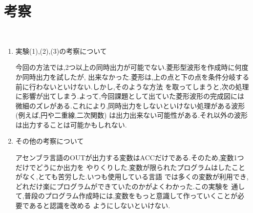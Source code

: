 \documentclass[a4paper,11pt,titlepage]{jarticle}
\begin{document}
\section{考察}
　\begin{enumerate}
  \item 実験(1),(2),(3)の考察について
  \par
      今回の方法では,2つ以上の同時出力が可能でない.菱形型波形を作成時に何度か同時出力を試したが,
    出来なかった.菱形は,上の点と下の点を条件分岐する前に行わないといけない.しかし,そのような方法
    を取ってしまうと,次の処理に影響が出てしまう.よって,今回課題として出ていた菱形波形の完成図には
    微細のズレがある.これにより,同時出力をしないといけない処理がある波形(例えば,円や二重線,二次関数)
    は出力出来ない可能性がある.それ以外の波形は出力することは可能かもしれない.
  \item その他の考察について
  \par
        アセンブラ言語のOUTが出力する変数はACCだけである.そのため,変数1つだけでどうにか出力を
      やりくりした.変数が限られたプログラムはしたことがなく,とても苦労した.いつも使用している言語
      では多くの変数が利用でき,どれだけ楽にプログラムができていたのかがよくわかった.この実験を
      通して,普段のプログラム作成時には,変数をもっと意識して作っていくことが必要であると認識を改める
      ようにしないといけない.
  \par
  \end{enumerate}
\end{document}

